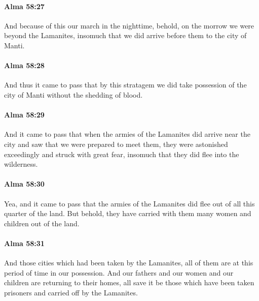 		\paragraph{Alma 58:27} %
			\label{ALMA-58-27}

			And because of this our march in the nighttime,
			behold, on the morrow we were beyond the Lamanites,
			insomuch that we did arrive before them to the city of Manti.

		\paragraph{Alma 58:28} %
			\label{ALMA-58-28}

			And thus it came to pass that by this stratagem
			we did take possession of the city of Manti without the shedding of blood.

		\paragraph{Alma 58:29} %
			\label{ALMA-58-29}

			And it came to pass that
			when the armies of the Lamanites did arrive near the city
			and saw that we were prepared to meet them,
			they were astonished exceedingly and struck with great fear,
			insomuch that they did flee into the wilderness.

		\paragraph{Alma 58:30} %
			\label{ALMA-58-30}

			Yea, and it came to pass that
			the armies of the Lamanites did flee out of all this quarter of the land.
			But behold, they have carried with them many women and children out of the land.

		\paragraph{Alma 58:31} %
			\label{ALMA-58-31}

			And those cities which had been taken by the Lamanites,
			all of them are at this period of time in our possession.
			And our fathers and our women and our children are returning to their homes,
			all save it be those which have been taken prisoners
			and carried off by the Lamanites.

